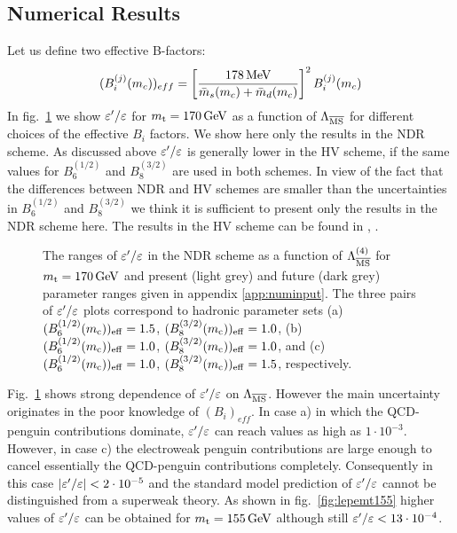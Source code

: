 \subsection{Numerical Results}
           \label{subsec:epenumres}
Let us define two effective B-factors:
\begin{equation}\label{7e}
(B_i^{(j)}(m_c))_{eff}= 
\left [\frac{178\, {\rm MeV}}{\bar m_s(m_c)+\bar m_d(m_c)} \right ]^2 B_i^{(j)}(m_c)
\end{equation}
In fig.\ \ref{fig:lepemt170} we show $\varepsilon'/\varepsilon$ for $m_{\rm t}=170\, {\rm GeV}$ as a function
of $\Lambda_{\overline{\rm MS}}$ for different choices of the effective $B_i$ factors.
We show here only the results in the NDR scheme. As discussed above
$\varepsilon'/\varepsilon$ is generally lower in the HV scheme, if the same values for
$B_6^{(1/2)}$ and $B_8^{(3/2)}$ are used in both schemes. In view of the
fact that the differences between NDR and HV schemes are smaller than
the uncertainties in $B_6^{(1/2)}$ and $B_8^{(3/2)}$ we think it is
sufficient to present only the results in the NDR scheme here. The
results in the HV scheme can be found in \cite{burasetal:92d},
\cite{ciuchini:95}.

\begin{figure}[htb]
\vspace{0.15in}
\centerline{
\epsfysize=6in
}
\vspace{0.15in}
\caption[]{
The ranges of $\varepsilon'/\varepsilon$ in the NDR scheme as a function of $\Lambda_{\overline{\rm MS}}^{(4)}$
for $m_{\rm t}=170\, {\rm GeV}$ and present (light grey) and future (dark grey)
parameter ranges given in appendix \ref{app:numinput}. The three pairs
of $\varepsilon'/\varepsilon$ plots correspond to hadronic parameter sets
(a) $(B_6^{(1/2)}(m_{\rm c}))_{\rm eff}=1.5$, $(B_8^{(3/2)}(m_{\rm c}))_{\rm eff}=1.0$,
(b) $(B_6^{(1/2)}(m_{\rm c}))_{\rm eff}=1.0$, $(B_8^{(3/2)}(m_{\rm c}))_{\rm eff}=1.0$,
and
(c) $(B_6^{(1/2)}(m_{\rm c}))_{\rm eff}=1.0$, $(B_8^{(3/2)}(m_{\rm c}))_{\rm eff}=1.5$,
respectively.
\label{fig:lepemt170}}
\end{figure}

Fig.\ \ref{fig:lepemt170} shows strong dependence of $\varepsilon'/\varepsilon$ on $\Lambda_{\overline{\rm MS}}$.
However the main uncertainty originates in the poor knowledge of
$(B_i)_{eff}$.  In case a) in which the QCD-penguin contributions
dominate, $\varepsilon'/\varepsilon$ can reach values as high as $1 \cdot 10^{-3}$.
However, in case c) the electroweak penguin contributions are large
enough to cancel essentially the QCD-penguin contributions completely.
Consequently in this case $|\varepsilon'/\varepsilon|< 2 \cdot 10^{-5}$ and the standard
model prediction of $\varepsilon'/\varepsilon$ cannot be distinguished from a superweak
theory. As shown in fig.\ \ref{fig:lepemt155} higher values of $\varepsilon'/\varepsilon$
can be obtained for $m_{\rm t} = 155\, {\rm GeV}$ although still $\varepsilon'/\varepsilon < 13 \cdot
10^{-4}$.

